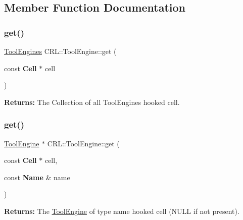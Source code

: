 \subsection{Member Function Documentation}
\mbox{\label{classCRL_1_1ToolEngine_afb78e8f180ecc36ff8fa4e91e7885d37}} 
\subsubsection{\texorpdfstring{get()}{get()}\hspace{0.1cm}{\footnotesize\ttfamily [1/2]}}
{\footnotesize\ttfamily \hyperlink{namespaceCRL_ae49bc0c5f113bba964680768556dd1b3}{Tool\+Engines} C\+R\+L\+::\+Tool\+Engine\+::get (\begin{DoxyParamCaption}\item[{const \textbf{ Cell} $\ast$}]{cell }\end{DoxyParamCaption})\hspace{0.3cm}{\ttfamily [static]}}

{\bfseries Returns\+:} The Collection of all Tool\+Engines hooked {\ttfamily cell}. \mbox{\label{classCRL_1_1ToolEngine_a1c2261333735f6fd59b51708516b8b23}} 
\subsubsection{\texorpdfstring{get()}{get()}\hspace{0.1cm}{\footnotesize\ttfamily [2/2]}}
{\footnotesize\ttfamily \hyperlink{classCRL_1_1ToolEngine}{Tool\+Engine} $\ast$ C\+R\+L\+::\+Tool\+Engine\+::get (\begin{DoxyParamCaption}\item[{const \textbf{ Cell} $\ast$}]{cell,  }\item[{const \textbf{ Name} \&}]{name }\end{DoxyParamCaption})\hspace{0.3cm}{\ttfamily [static]}}

{\bfseries Returns\+:} The \hyperlink{classCRL_1_1ToolEngine}{Tool\+Engine} of type {\ttfamily name} hooked {\ttfamily cell} ({\ttfamily N\+U\+LL} if not present). \mbox{\label{classCRL_1_1ToolEngine_a3ce4d591198922c56a328bced79dd921}} 
